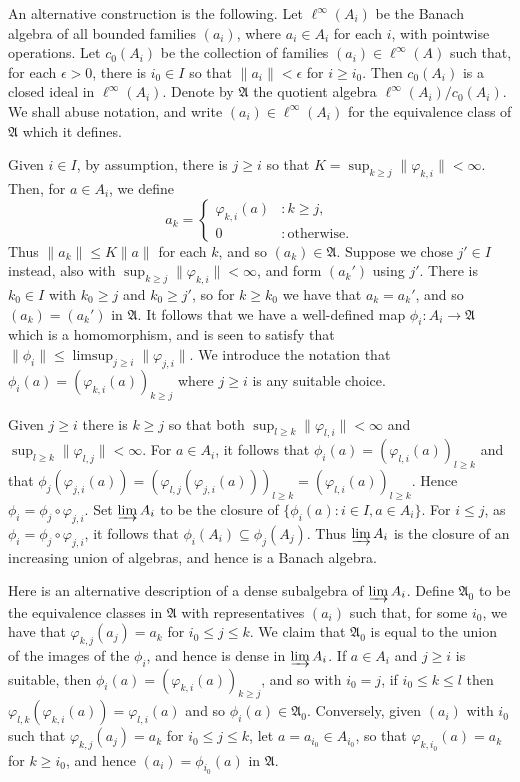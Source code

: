\documentclass[a4paper,11pt]{article}
\newcommand{\mf}{\mathfrak}
\newcommand{\indlim}{\varinjlim}
\theoremstyle{definition}
\begin{document}
An alternative construction is the following.  Let $\ell^\infty(A_i)$ be the Banach algebra of all
bounded families $(a_i)$, where $a_i\in A_i$ for each $i$, with pointwise operations.
Let $c_0(A_i)$ be the collection of families $(a_i)\in \ell^\infty(A)$ such that, for each
$\epsilon>0$, there is $i_0\in I$ so that $\|a_i\|<\epsilon$ for $i\geq i_0$.  Then $c_0(A_i)$
is a closed ideal in $\ell^\infty(A_i)$.  Denote by $\mf A$ the quotient algebra
$\ell^\infty(A_i) / c_0(A_i)$.  We shall abuse notation, and write $(a_i)\in\ell^\infty(A_i)$
for the equivalence class of $\mf A$ which it defines.

Given $i\in I$, by assumption, there is $j\geq i$ so that
$K = \sup_{k\geq j} \|\varphi_{k,i}\| < \infty$.  Then, for $a\in A_i$, we define
\[ a_k = \begin{cases} \varphi_{k,i}(a) & : k\geq j, \\ 0 & : \text{otherwise}. \end{cases} \]
Thus $\|a_k\| \leq K\|a\|$ for each $k$, and so $(a_k) \in \mf A$.  Suppose we chose $j'\in I$
instead, also with $\sup_{k\geq j} \|\varphi_{k,i}\| < \infty$, and form $(a_k')$ using $j'$.
There is $k_0\in I$ with $k_0 \geq j$ and $k_0 \geq j'$, so for $k\geq k_0$ we have that
$a_k = a_k'$, and so $(a_k) = (a_k')$ in $\mf A$.  It follows that we have a well-defined map
$\phi_i:A_i\rightarrow\mf A$ which is a homomorphism, and is seen to satisfy that $\|\phi_i\| \leq
\limsup_{j\geq i} \|\varphi_{j,i}\|$.  We introduce the notation that $\phi_i(a) =
( \varphi_{k,i}(a) )_{k\geq j}$ where $j\geq i$ is any suitable choice.

Given $j\geq i$ there is $k\geq j$ so that both $\sup_{l\geq k} \|\varphi_{l,i}\|<\infty$ and
$\sup_{l\geq k} \|\varphi_{l,j}\|<\infty$.  For $a\in A_i$, it follows that $\phi_i(a) =
( \varphi_{l,i}(a) )_{l\geq k}$ and that $\phi_j(\varphi_{j,i}(a)) =
( \varphi_{l,j}(\varphi_{j,i}(a)) )_{l\geq k} = 
( \varphi_{l,i}(a) )_{l\geq k}$.  Hence $\phi_i = \phi_j \circ \varphi_{j,i}$.
Set $\indlim A_i$ to be the closure of $\{\phi_i(a) : i\in I, a\in A_i \}$.  For $i\leq j$, as
$\phi_i = \phi_j \circ \varphi_{j,i}$, it follows that $\phi_i(A_i) \subseteq \phi_j(A_j)$.
Thus $\indlim A_i$ is the closure of an increasing union of algebras, and hence is a Banach algebra.

Here is an alternative description of a dense subalgebra of $\indlim A_i$.
Define $\mf A_0$ to be the equivalence classes in $\mf A$ with representatives $(a_i)$ such that,
for some $i_0$, we have that $\varphi_{k,j}(a_j) = a_k$ for $i_0 \leq j \leq k$.  We claim that
$\mf A_0$ is equal to the union of the images of the $\phi_i$, and hence is dense in
$\indlim A_i$.  If $a\in A_i$ and $j\geq i$ is suitable, then $\phi_i(a) = ( \varphi_{k,i}(a)
)_{k\geq j}$, and so with $i_0=j$, if $i_0 \leq k \leq l$ then $\varphi_{l,k}( \varphi_{k,i}(a) )
= \varphi_{l,i}(a)$ and so $\phi_i(a)\in \mf A_0$.  Conversely, given $(a_i)$ with $i_0$ such that
$\varphi_{k,j}(a_j) = a_k$ for $i_0 \leq j \leq k$, let $a = a_{i_0} \in A_{i_0}$, so that
$\varphi_{k,i_0}(a) = a_k$ for $k\geq i_0$, and hence $(a_i) = \phi_{i_0}(a)$ in $\mf A$.
\end{document}
